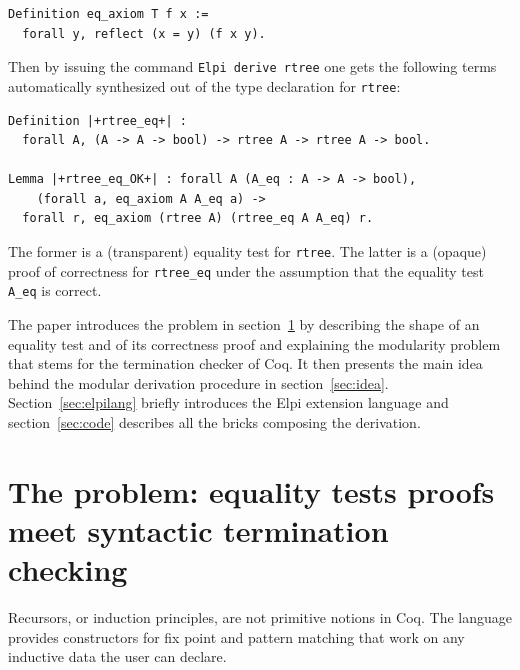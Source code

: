 \documentclass[sigplan,10pt,review]{acmart}\settopmatter{printfolios=true,printccs=false,printacmref=false}
\begin{document}
\begin{minipage}{\textwidth}\begin{lstlisting}
Definition eq_axiom T f x :=
  forall y, reflect (x = y) (f x y).
\end{lstlisting}\end{minipage}

\noindent
Then by issuing the command \lstinline+Elpi derive rtree+ one gets
the following terms automatically synthesized out of the type
declaration for \lstinline+rtree+:

\begin{minipage}{\textwidth}\begin{lstlisting}
Definition |+rtree_eq+| :
  forall A, (A -> A -> bool) -> rtree A -> rtree A -> bool.

Lemma |+rtree_eq_OK+| : forall A (A_eq : A -> A -> bool),
    (forall a, eq_axiom A A_eq a) ->
  forall r, eq_axiom (rtree A) (rtree_eq A A_eq) r.
\end{lstlisting}\end{minipage}

\noindent
The former is a (transparent) equality test for \lstinline+rtree+.
The latter is a (opaque) proof of correctness for \lstinline+rtree_eq+
under the assumption that the equality test \lstinline+A_eq+ is correct.

The paper introduces the problem in
section~\ref{sec:problem} by describing the shape of an equality test
and of its correctness proof and explaining the modularity problem
that stems for the termination checker of Coq. It then
presents the main idea behind the
modular derivation procedure in section~\ref{sec:idea}.
Section~\ref{sec:elpilang} briefly introduces the Elpi extension language
and section~\ref{sec:code} describes all the bricks composing the
derivation.


\section{The problem: equality tests proofs meet syntactic termination checking} %
\label{sec:problem}

Recursors, or induction principles, are not primitive notions in Coq.
The language provides constructors for fix point and pattern matching
that work on any inductive data the user can declare.
\end{document}
